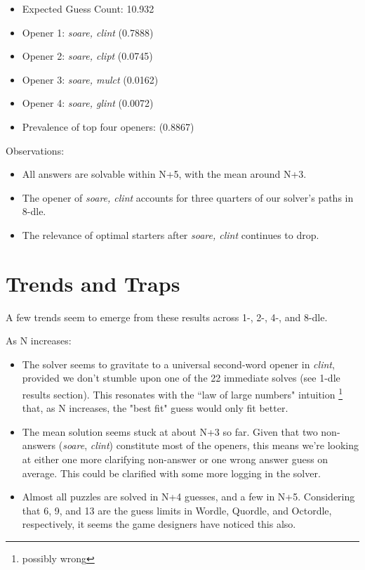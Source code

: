 \documentclass[11pt, oneside]{article} 	%
\begin{document}
\begin{itemize}
\item Expected Guess Count: 10.932
\item Opener 1: \emph{soare, clint} (0.7888)
\item Opener 2: \emph{soare, clipt} (0.0745)
\item Opener 3: \emph{soare, mulct} (0.0162)
\item Opener 4: \emph{soare, glint} (0.0072)
\item Prevalence of top four openers: (0.8867)
\end{itemize}

Observations: 
\begin{itemize}
\item All answers are solvable within N+5, with the mean around N+3. 
\item The opener of \emph{soare, clint} accounts for three quarters of our solver's paths in 8-dle.
\item The relevance of optimal starters after \emph{soare, clint} continues to drop. 
\end{itemize}

\section{Trends and Traps}

A few trends seem to emerge from these results across 1-, 2-, 4-, and 8-dle.  

As N increases:
\begin{itemize}
\item The solver seems to gravitate to a universal second-word opener in \emph{clint}, provided we don't stumble upon one of the 22 immediate solves (see 1-dle results section). This resonates with the ``law of large numbers" intuition \footnote{possibly wrong} that, as N increases, the "best fit" guess would only fit better.
\item The mean solution seems stuck at about N+3 so far. Given that two non-answers (\emph{soare}, \emph{clint}) constitute most of the openers, this means we're looking at either one more clarifying non-answer or one wrong answer guess on average. This could be clarified with some more logging in the solver.
\item Almost all puzzles are solved in N+4 guesses, and a few in N+5. Considering that 6, 9, and 13 are the guess limits in Wordle, Quordle, and Octordle, respectively, it seems the game designers have noticed this also.
\end{itemize}
 
\end{document}
